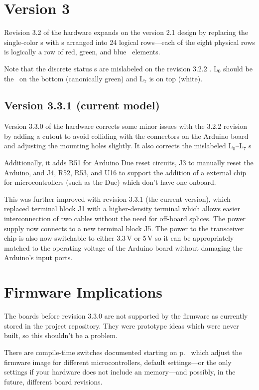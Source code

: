 \section{Version 3}
Revision 3.2 of the hardware expands on the version 2.1 design by replacing the single-color \led s with
 \led s arranged into 24 logical rows---each of the eight physical rows is logically a row of red,
green, and blue \led\ elements.

Note that the discrete status \led s are mislabeled on the revision 3.2.2 . L$_0$ should be the \led\
on the bottom (canonically green) and L$_7$ is on top (white).

\subsection{Version 3.3.1 (current model)}
Version 3.3.0 of the hardware corrects some minor issues with the 3.2.2 revision by adding a cutout to avoid colliding with the
connectors on the Arduino board and adjusting the mounting holes slightly. It also corrects the mislabeled L$_0$--L$_7$ \led s

Additionally, it adds R51 for Arduino Due reset circuits, J3 to manually reset the Arduino, and J4, R52, R53, and U16 to support the addition of a external
\acronym{EEPROM} chip for microcontrollers (such as the Due) which don't have one onboard.

This was further improved with revision 3.3.1 (the current version), which replaced terminal block J1 with a higher-density terminal
which allows easier interconnection of two \acronym{CAT6} cables without the need for off-board splices. The power supply now connects to
a new terminal block J5. The power to the \acronym{RS-485} transceiver chip is also now switchable to either 3.3\,V or 5\,V so it can be
appropriately matched to the operating voltage of the Arduino board without damaging the Arduino's input ports.

\section{Firmware Implications}
The boards before  revision 3.3.0 are not supported by the firmware as currently stored in the project repository. They were prototype ideas
which were never built, so this shouldn't be a problem. 

There are compile-time switches documented starting on p.~\pageref{config-fw} which adjust the firmware
image for different microcontrollers, default settings---or the only settings if your hardware does not
include an \acronym{EEPROM} memory---and possibly, in the future, different board revisions.

